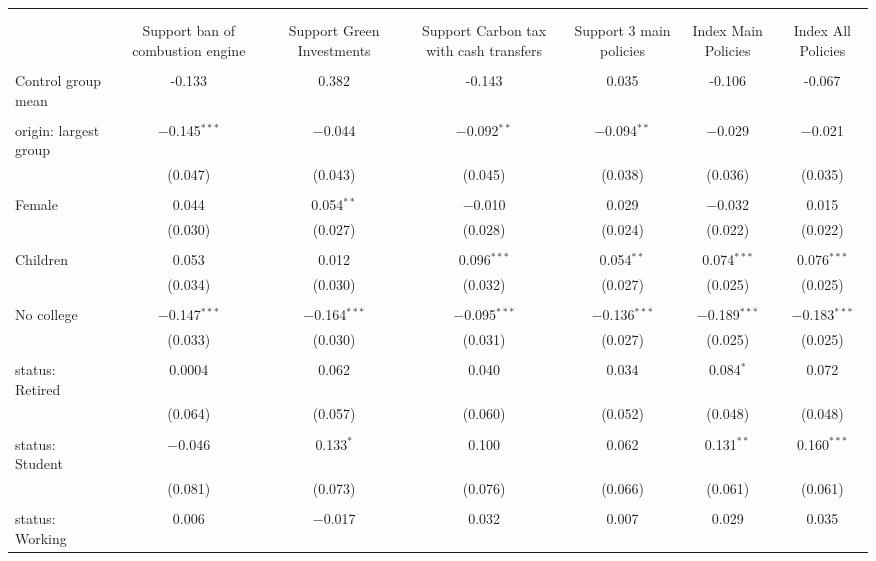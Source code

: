 
\begin{tabular}{@{\extracolsep{5pt}}lcccccc} 
\\[-1.8ex]\hline 
\hline \\[-1.8ex] 
\\[-1.8ex] & Support ban of combustion engine & Support Green Investments & Support Carbon tax 
 with cash transfers & Support 3 main policies & Index Main Policies & Index All Policies \\ 
\hline \\[-1.8ex] 
 Control group mean & -0.133 & 0.382 & -0.143 & 0.035 & -0.106 & -0.067  \\ \hline \\[-1.8ex] origin: largest group & $-$0.145$^{***}$ & $-$0.044 & $-$0.092$^{**}$ & $-$0.094$^{**}$ & $-$0.029 & $-$0.021 \\ 
  & (0.047) & (0.043) & (0.045) & (0.038) & (0.036) & (0.035) \\ 
  & & & & & & \\ 
 Female & 0.044 & 0.054$^{**}$ & $-$0.010 & 0.029 & $-$0.032 & 0.015 \\ 
  & (0.030) & (0.027) & (0.028) & (0.024) & (0.022) & (0.022) \\ 
  & & & & & & \\ 
 Children & 0.053 & 0.012 & 0.096$^{***}$ & 0.054$^{**}$ & 0.074$^{***}$ & 0.076$^{***}$ \\ 
  & (0.034) & (0.030) & (0.032) & (0.027) & (0.025) & (0.025) \\ 
  & & & & & & \\ 
 No college & $-$0.147$^{***}$ & $-$0.164$^{***}$ & $-$0.095$^{***}$ & $-$0.136$^{***}$ & $-$0.189$^{***}$ & $-$0.183$^{***}$ \\ 
  & (0.033) & (0.030) & (0.031) & (0.027) & (0.025) & (0.025) \\ 
  & & & & & & \\ 
 status: Retired & 0.0004 & 0.062 & 0.040 & 0.034 & 0.084$^{*}$ & 0.072 \\ 
  & (0.064) & (0.057) & (0.060) & (0.052) & (0.048) & (0.048) \\ 
  & & & & & & \\ 
 status: Student & $-$0.046 & 0.133$^{*}$ & 0.100 & 0.062 & 0.131$^{**}$ & 0.160$^{***}$ \\ 
  & (0.081) & (0.073) & (0.076) & (0.066) & (0.061) & (0.061) \\ 
  & & & & & & \\ 
 status: Working & 0.006 & $-$0.017 & 0.032 & 0.007 & 0.029 & 0.035 \\ 

\end{tabular}
